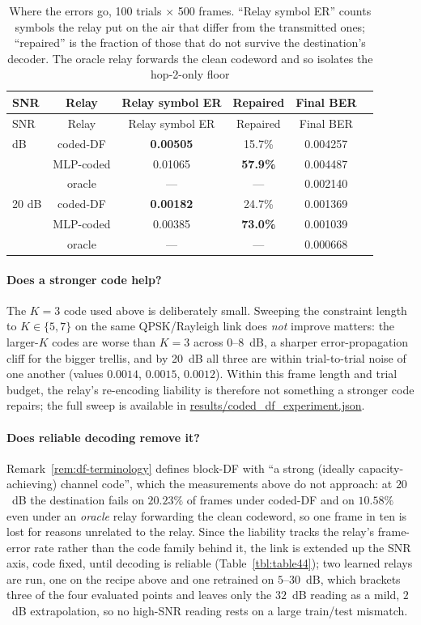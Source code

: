 \begin{longtable}[]{@{}lccccc@{}}
\caption[Where the errors go: relay output versus destination output]{Where the errors go, 100 trials $\times$ 500 frames. ``Relay symbol ER'' counts symbols the relay put on the air that differ from the transmitted ones; ``repaired'' is the fraction of those that do not survive the destination's decoder. The oracle relay forwards the clean codeword and so isolates the hop-2-only floor}\label{tbl:table38}\tabularnewline
\toprule\noalign{}
SNR & Relay & Relay symbol ER & Repaired & Final BER \\
\midrule\noalign{}
\endfirsthead
\toprule\noalign{}
SNR & Relay & Relay symbol ER & Repaired & Final BER \\
\midrule\noalign{}
\endhead
\bottomrule\noalign{}
\endlastfoot
16 dB & coded-DF & \textbf{0.00505} & 15.7\% & 0.004257 \\
 & MLP-coded & 0.01065 & \textbf{57.9\%} & 0.004487 \\
 & oracle & --- & --- & 0.002140 \\
\hline
20 dB & coded-DF & \textbf{0.00182} & 24.7\% & 0.001369 \\
 & MLP-coded & 0.00385 & \textbf{73.0\%} & 0.001039 \\
 & oracle & --- & --- & 0.000668 \\
\end{longtable}

\paragraph{Does a stronger code help?} The $K{=}3$ code used above is deliberately small. Sweeping the constraint length to $K\in\{5,7\}$ on the same QPSK/Rayleigh link does \emph{not} improve matters: the larger-$K$ codes are worse than $K{=}3$ across 0--8~dB, a sharper error-propagation cliff for the bigger trellis, and by 20~dB all three are within trial-to-trial noise of one another (values $0.0014$, $0.0015$, $0.0012$). Within this frame length and trial budget, the relay's re-encoding liability is therefore not something a stronger code repairs; the full sweep is available in \url{results/coded_df_experiment.json}.

\paragraph{Does reliable decoding remove it?} Remark~\ref{rem:df-terminology} defines block-DF with ``a strong (ideally capacity-achieving) channel code'', which the measurements above do not approach: at $20$~dB the destination fails on $20.23\%$ of frames under coded-DF and on $10.58\%$ even under an \emph{oracle} relay forwarding the clean codeword, so one frame in ten is lost for reasons unrelated to the relay. Since the liability tracks the relay's frame-error rate rather than the code family behind it, the link is extended up the SNR axis, code fixed, until decoding is reliable (Table~\ref{tbl:table44}); two learned relays are run, one on the recipe above and one retrained on $5$--$30$~dB, which brackets three of the four evaluated points and leaves only the $32$~dB reading as a mild, $2$~dB extrapolation, so no high-SNR reading rests on a large train/test mismatch.

